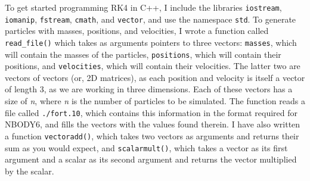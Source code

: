 \documentclass{article}
\begin{document}
To get started programming RK4 in C++, I include the libraries \colorbox{g}{\lstinline[basicstyle=\ttfamily\footnotesize\color{black}]|iostream|}, \colorbox{g}{\lstinline[basicstyle=\ttfamily\footnotesize\color{black}]|iomanip|}, \colorbox{g}{\lstinline[basicstyle=\ttfamily\footnotesize\color{black}]|fstream|}, \colorbox{g}{\lstinline[basicstyle=\ttfamily\footnotesize\color{black}]|cmath|}, and \colorbox{g}{\lstinline[basicstyle=\ttfamily\footnotesize\color{black}]|vector|}, and use the namespace \colorbox{g}{\lstinline[basicstyle=\ttfamily\footnotesize\color{black}]|std|}. To generate particles with masses, positions, and velocities, I wrote a function called \colorbox{g}{\lstinline[basicstyle=\ttfamily\footnotesize\color{black}]|read_file()|} which takes as arguments pointers to three vectors: \colorbox{g}{\lstinline[basicstyle=\ttfamily\footnotesize\color{black}]|masses|}, which will contain the masses of the particles, \colorbox{g}{\lstinline[basicstyle=\ttfamily\footnotesize\color{black}]|positions|}, which will contain their positions, and \colorbox{g}{\lstinline[basicstyle=\ttfamily\footnotesize\color{black}]|velocities|}, which will contain their velocities. The latter two are vectors of vectors (or, 2D matrices), as each position and velocity is itself a vector of length 3, as we are working in three dimensions. Each of these vectors has a size of \textit{n}, where \textit{n} is the number of particles to be simulated. The function reads a file called \colorbox{g}{\lstinline[basicstyle=\ttfamily\footnotesize\color{black}]|./fort.10|}, which contains this information in the format required for NBODY6, and fills the vectors with the values found therein. I have also written a function \colorbox{g}{\lstinline[basicstyle=\ttfamily\footnotesize\color{black}]|vectoradd()|}, which takes two vectors as arguments and returns their sum as you would expect, and \colorbox{g}{\lstinline[basicstyle=\ttfamily\footnotesize\color{black}]|scalarmult()|}, which takes a vector as its first argument and a scalar as its second argument and returns the vector multiplied by the scalar. 
\end{document}
